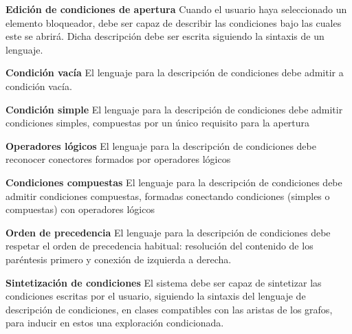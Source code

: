 \item \textbf{Edición de condiciones de apertura}\newline
	Cuando el usuario haya seleccionado un elemento bloqueador, debe ser capaz de describir las condiciones bajo las cuales este se abrirá. Dicha descripción debe ser escrita siguiendo la sintaxis de un lenguaje.
	\begin{functional}
		\item \textbf{Condición vacía}\newline
			El lenguaje para la descripción de condiciones debe admitir a condición vacía.
		\item \textbf{Condición simple}\newline
			El lenguaje para la descripción de condiciones debe admitir condiciones simples, compuestas por un único requisito para la apertura
		\item \textbf{Operadores lógicos}\newline
			El lenguaje para la descripción de condiciones debe reconocer conectores formados por operadores lógicos
		\item \textbf{Condiciones compuestas}\newline
			El lenguaje para la descripción de condiciones debe admitir condiciones compuestas, formadas conectando condiciones (simples o compuestas) con operadores lógicos
		\item \textbf{Orden de precedencia}\newline
			El lenguaje para la descripción de condiciones debe respetar el orden de precedencia habitual: resolución del contenido de los paréntesis primero y conexión de izquierda a derecha.
	\end{functional}
\item \textbf{Sintetización de condiciones}\newline
	El sistema debe ser capaz de sintetizar las condiciones escritas por el usuario, siguiendo la sintaxis del lenguaje de descripción de condiciones, en clases compatibles con las aristas de los grafos, para inducir en estos una exploración condicionada.